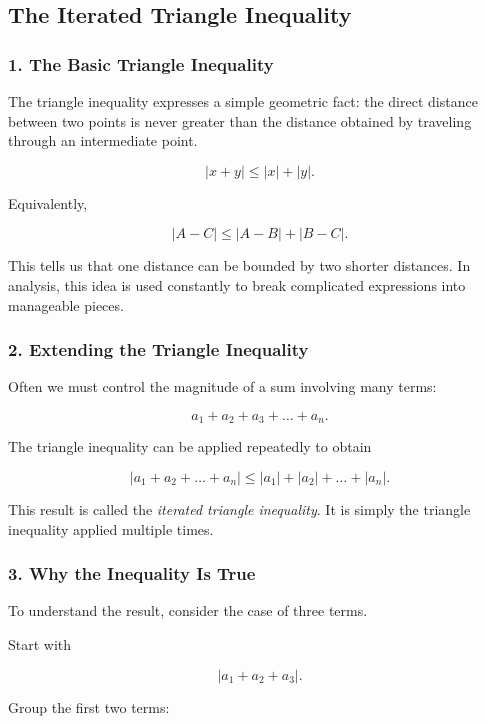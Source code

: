 \subsection{The Iterated Triangle Inequality}
\label{sec:iterated-triangle-inequality}

\subsubsection*{1. The Basic Triangle Inequality}

The triangle inequality expresses a simple geometric fact: the direct
distance between two points is never greater than the distance obtained
by traveling through an intermediate point.

\[
|x+y| \le |x| + |y|.
\]

Equivalently,

\[
|A-C| \le |A-B| + |B-C|.
\]

This tells us that one distance can be bounded by two shorter distances.
In analysis, this idea is used constantly to break complicated
expressions into manageable pieces.

\bigskip

\subsubsection*{2. Extending the Triangle Inequality}

Often we must control the magnitude of a sum involving many terms:

\[
a_1 + a_2 + a_3 + \dots + a_n.
\]

The triangle inequality can be applied repeatedly to obtain

\[
|a_1 + a_2 + \dots + a_n|
\le
|a_1| + |a_2| + \dots + |a_n|.
\]

This result is called the \emph{iterated triangle inequality}.  
It is simply the triangle inequality applied multiple times.

\bigskip

\subsubsection*{3. Why the Inequality Is True}

To understand the result, consider the case of three terms.

Start with

\[
|a_1 + a_2 + a_3|.
\]

Group the first two terms:

